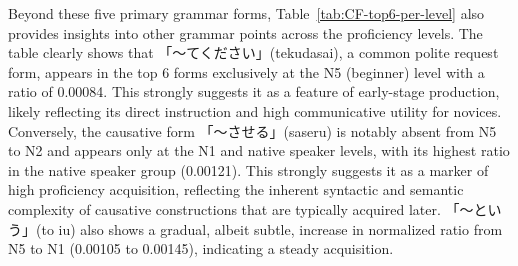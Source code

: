 Beyond these five primary grammar forms, Table~\ref{tab:CF-top6-per-level} also provides insights into other grammar
points across the proficiency levels. The table clearly shows that 「〜てください」(tekudasai), a common polite request
form, appears in the top 6 forms exclusively at the N5 (beginner) level with a ratio of 0.00084. This strongly
suggests it as a feature of early-stage production, likely reflecting its direct instruction and high communicative
utility for novices. Conversely, the causative form 「〜させる」(saseru) is notably absent from N5 to N2 and appears only
at the N1 and native speaker levels, with its highest ratio in the native speaker group (0.00121). This strongly
suggests it as a marker of high proficiency acquisition, reflecting the inherent syntactic and semantic complexity
of causative constructions that are typically acquired later. 「〜という」(to iu) also shows a gradual, albeit subtle,
increase in normalized ratio from N5 to N1 (0.00105 to 0.00145), indicating a steady acquisition.

\begin{table}[h!]
\centering
\small
{}
\caption[Top 6 Grammar Forms by use Ratio across JLPT Levels]{Top 6 Grammar Forms by Ratio Across JLPT Levels (Top 6 per level)}
\label{tab:CF-top6-per-level}
\end{table}



